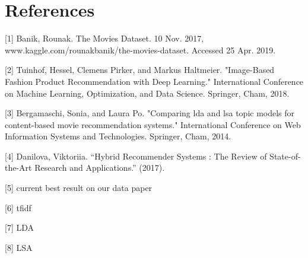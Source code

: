 \documentclass{article}
\begin{document}
\section*{References}
\small
[1] Banik, Rounak. The Movies Dataset. 10 Nov. 2017, www.kaggle.com/rounakbanik/the-movies-dataset. Accessed 25 Apr. 2019.

[2] Tuinhof, Hessel, Clemens Pirker, and Markus Haltmeier. "Image-Based Fashion Product Recommendation with Deep Learning." International Conference on Machine Learning, Optimization, and Data Science. Springer, Cham, 2018.

[3] Bergamaschi, Sonia, and Laura Po. "Comparing lda and lsa topic models for content-based movie recommendation systems." International Conference on Web Information Systems and Technologies. Springer, Cham, 2014.

[4] Danilova, Viktoriia. “Hybrid Recommender Systems : The Review of State-of-the-Art Research and Applications.” (2017).

[5] current best result on our data paper

[6] tfidf

[7] LDA

[8] LSA
\end{document}
